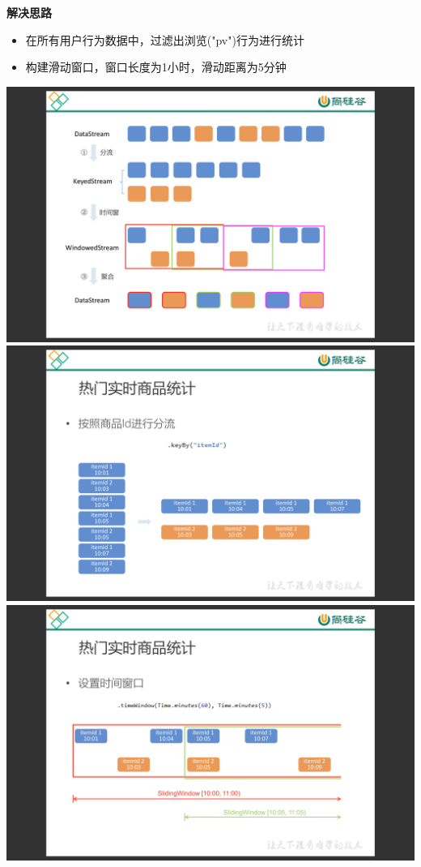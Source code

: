 \documentclass[oneside]{ctexbook}
\begin{document}
\textbf{解决思路}

\begin{itemize}
\item 在所有用户行为数据中，过滤出浏览("pv")行为进行统计
\item 构建滑动窗口，窗口长度为1小时，滑动距离为5分钟
\end{itemize}

\noindent \includegraphics[width=\textwidth]{电商用户行为数据分析1.png}
\noindent \includegraphics[width=\textwidth]{电商用户行为数据分析2.png}
\noindent \includegraphics[width=\textwidth]{电商用户行为数据分析3.png}
\end{document}
